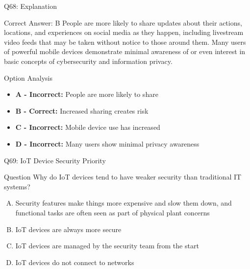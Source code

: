 \documentclass{beamer}
\begin{document}
	\begin{frame}{Q68: Explanation}
		\begin{block}{Correct Answer: B}
			People are more likely to share updates about their actions, locations, and experiences on social media as they happen, including livestream video feeds that may be taken without notice to those around them. Many users of powerful mobile devices demonstrate minimal awareness of or even interest in basic concepts of cybersecurity and information privacy.
		\end{block}
		\begin{block}{Option Analysis}
			\begin{itemize}
				\item \textbf{A - Incorrect:} People are more likely to share
				\item \textbf{B - Correct:} Increased sharing creates risk
				\item \textbf{C - Incorrect:} Mobile device use has increased
				\item \textbf{D - Incorrect:} Many users show minimal privacy awareness
			\end{itemize}
		\end{block}
	\end{frame}
	
	\begin{frame}{Q69: IoT Device Security Priority}
		\begin{block}{Question}
			Why do IoT devices tend to have weaker security than traditional IT systems?
		\end{block}
		\begin{enumerate}[(A)]
			\item Security features make things more expensive and slow them down, and functional tasks are often seen as part of physical plant concerns
			\item IoT devices are always more secure
			\item IoT devices are managed by the security team from the start
			\item IoT devices do not connect to networks
		\end{enumerate}
	\end{frame}
	
\end{document}
